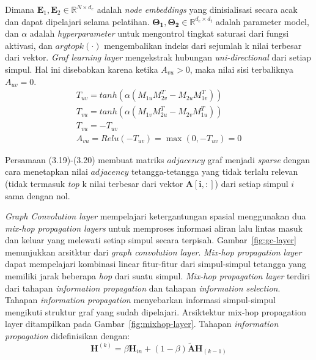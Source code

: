 Dimana $\mathbf{E}_1,\mathbf{E}_2\in \mathbb{R}^{N\times d_e}$ adalah \textit{node embeddings} yang dinisialisasi secara acak dan dapat dipelajari selama pelatihan. $\mathbf{\Theta_1},\mathbf{\Theta_2}\in \mathbb{R}^{d_e \times d_t}$ adalah parameter model, dan $\alpha$ adalah \textit{hyperparameter} untuk mengontrol tingkat saturasi dari fungsi aktivasi, dan $argtopk(\cdot)$ mengembalikan indeks dari sejumlah k nilai terbesar dari vektor.\textit{ Graf learning layer} mengekstrak hubungan \textit{uni-directional} dari setiap simpul. Hal ini disebabkan karena ketika $A_{vu}>0$, maka nilai sisi terbaliknya $A_{uv}=0$. 
\begin{align}
    T_{uv}=tanh(\alpha(M_{1u}M_{2v}^T-M_{2u}M_{1v}^T))\\
    T_{vu}=tanh(\alpha(M_{1v}M_{2u}^T-M_{2v}M_{1u}^T))\\
    T_{vu}=-T_{uv}\\
    A_{vu}=Relu(-T_{uv})=\max (0,-T_{uv})=0
\end{align}

Persamaan (3.19)-(3.20) membuat matriks $adjacency$ graf menjadi \textit{sparse} dengan cara menetapkan nilai $adjacency$ tetangga-tetangga yang tidak terlalu relevan (tidak termasuk \textit{top} k nilai terbesar dari vektor $\mathbf{A[i,:]}$) dari setiap simpul $i$ sama dengan nol.

\textit{Graph Convolution layer} mempelajari ketergantungan spasial menggunakan dua \textit{mix-hop }\textit{propagation layers} untuk memproses informasi aliran lalu lintas masuk dan keluar yang melewati setiap simpul secara terpisah. Gambar~\ref{fig:gc-layer} menunjukkan arsitktur dari \textit{graph convolution layer}. \textit{Mix-hop propagation layer} dapat mempelajari kombinasi linear fitur-fitur dari simpul-simpul tetangga yang memiliki jarak beberapa \textit{hop} dari suatu simpul. \textit{Mix-hop propagation layer} terdiri dari tahapan \textit{information propagation} dan tahapan \textit{information selection}. Tahapan \textit{information propagation} menyebarkan informasi simpul-simpul mengikuti struktur graf yang sudah dipelajari. Arsiktektur mix-hop propagation layer ditampilkan pada Gambar~\ref{fig:mixhop-layer}. Tahapan \textit{information propagation} didefinisikan dengan:
\begin{equation}
    \mathbf{H}^{(k)}=\beta \mathbf{H}_{in}+(1-\beta ) \tilde{\mathbf{A}} \mathbf{H}_{(k-1)}
\end{equation}


